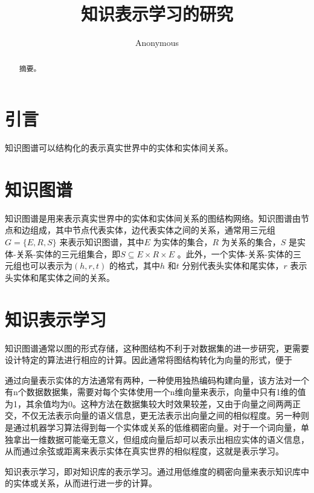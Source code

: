 \documentclass{llncs}
\begin{document}
	
\title{知识表示学习的研究}
\author{Anonymous}
\maketitle

\begin{abstract}

摘要。


\end{abstract}

\section{引言}

知识图谱可以结构化的表示真实世界中的实体和实体间关系。

\section{知识图谱}

知识图谱是用来表示真实世界中的实体和实体间关系的图结构网络。知识图谱由节点和边组成，其中节点代表实体，边代表实体之间的关系，通常用三元组$G=\{E,R,S\}$ 来表示知识图谱，其中$E$ 为实体的集合，$R$ 为关系的集合，$S$ 是实体-关系-实体的三元组集合，即$S\subseteq{E×R×E}$ 。此外，一个实体-关系-实体的三元组也可以表示为$(h,r,t)$ 的格式，其中$h$ 和$t$ 分别代表头实体和尾实体，$r$ 表示头实体和尾实体之间的关系。

\section{知识表示学习}

知识图谱通常以图的形式存储，这种图结构不利于对数据集的进一步研究，更需要设计特定的算法进行相应的计算。因此通常将图结构转化为向量的形式，便于

通过向量表示实体的方法通常有两种，一种使用独热编码构建向量，该方法对一个有n个数据数据集，需要对每个实体使用一个n维向量来表示，向量中只有1维的值为1，其余值均为0。这种方法在数据集较大时效果较差，又由于向量之间两两正交，不仅无法表示向量的语义信息，更无法表示出向量之间的相似程度。另一种则是通过机器学习算法得到每一个实体或关系的低维稠密向量。对于一个词向量，单独拿出一维数据可能毫无意义，但组成向量后却可以表示出相应实体的语义信息，从而通过余弦或距离来表示实体在真实世界的相似程度，这就是表示学习。

知识表示学习，即对知识库的表示学习。通过用低维度的稠密向量来表示知识库中的实体或关系，从而进行进一步的计算。
\end{document}
